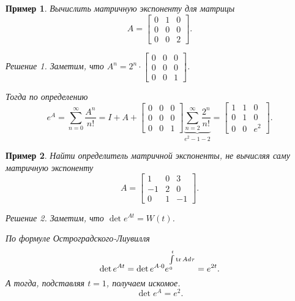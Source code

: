 \documentclass[a5paper, 11pt]{article}
\theoremstyle{definition}
\theoremstyle{plain}
\newtheorem{Ex}{Пример}
\theoremstyle{remark}
\newtheorem*{Solution}{Решение}
\begin{document}
	\begin{Ex}
		Вычислить матричную экспоненту для матрицы
		\[
		A = \begin{bmatrix}
			0 & 1 & 0\\
			0 & 0 & 0 \\
			0 & 0 & 2
		\end{bmatrix}.
		\]
		\begin{Solution}
			Заметим, что $A^n = 2^n \cdot \begin{bmatrix}
				0 & 0 & 0 \\
				0 & 0 & 0 \\
				0 & 0 & 1
			\end{bmatrix}$.
		
		Тогда по определению
		\[
		e^A = \sum\limits_{n=0}^\infty \frac{A^n}{n!} = I + A + \begin{bmatrix}
			0 & 0 & 0 \\
			0 & 0 & 0 \\
			0 & 0 & 1
		\end{bmatrix} \underbrace{\sum\limits_{n=2}^\infty \frac{2^n}{n!}}_{e^2-1-2} = \begin{bmatrix}
		1 & 1 & 0\\
		0& 1 & 0\\
		0 & 0& e^2
	\end{bmatrix}.
		\]
		\end{Solution}
	\end{Ex}

	\begin{Ex}
		Найти определитель матричной экспоненты, не вычисляя саму матричную экспоненту
		\[
		A = \begin{bmatrix}
			1 & 0 & 3\\
			-1 & 2 & 0\\
			0 & 1 & -1
		\end{bmatrix}.
		\]
		\begin{Solution}
			Заметим, что $\det e^{At} = W(t)$.
			
			По формуле Остроградского-Лиувилля 
			\[
			\det e^{At}  = \det e^{A\cdot 0} e^{\int\limits_0^t \operatorname{tr} A d\tau} = e^{2t}.
			\]
			А тогда, подставляя $t=1$, получаем искомое.
			\[
			\det e^{A} = e^2.
			\]
		\end{Solution}
	\end{Ex}
\end{document}
